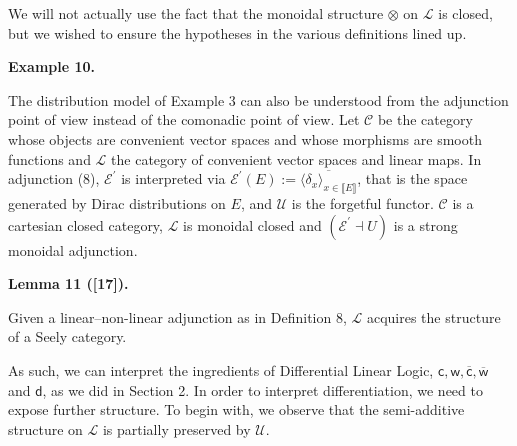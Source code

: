 \documentclass[10pt,a4paper]{article}
\begin{document}
 
We will not actually use the fact that the monoidal structure $\otimes$ on $\mathscr{L}$ is closed, but we wished to ensure the hypotheses in the various definitions lined up.\par
 
 
 
 
\par\medskip\noindent\textbf{Example 10.}\par
 
 
The distribution model of Example 3 can also be understood from the adjunction point of view instead of the comonadic point of view. Let $\mathscr{C}$ be the category whose objects are convenient vector spaces and whose morphisms are smooth functions and $\mathscr{L}$ the category of convenient vector spaces and linear maps. In adjunction (8), $\mathcal{E}^{\prime}$ is interpreted via $\mathcal{E}^{\prime}(E):=\overline{\langle\delta_{x}\rangle_{x\in\llbracket{E}\rrbracket}}$, that is the space generated by Dirac distributions on $E$, and $\mathcal{U}$ is the forgetful functor. $\mathscr{C}$ is a cartesian closed category, $\mathscr{L}$ is monoidal closed and $(\mathcal{E}^{\prime}\dashv U)$ is a strong monoidal adjunction.\par
 
 
 
 
\par\medskip\noindent\textbf{Lemma 11 ([17]).}\par
 
 
Given a linear–non-linear adjunction as in Definition 8, $\mathscr{L}$ acquires the structure of a Seely category.\par
 
 
 
 
As such, we can interpret the ingredients of Differential Linear Logic, ${\mathsf{c}},{\mathsf{w}},\overline{\mathsf{c}},\overline{\mathsf{w}}$ and ${\mathsf{d}}$, as we did in Section 2. In order to interpret differentiation, we need to expose further structure. To begin with, we observe that the semi-additive structure on $\mathscr{L}$ is partially preserved by $\mathcal{U}$.\par
 
\end{document}
